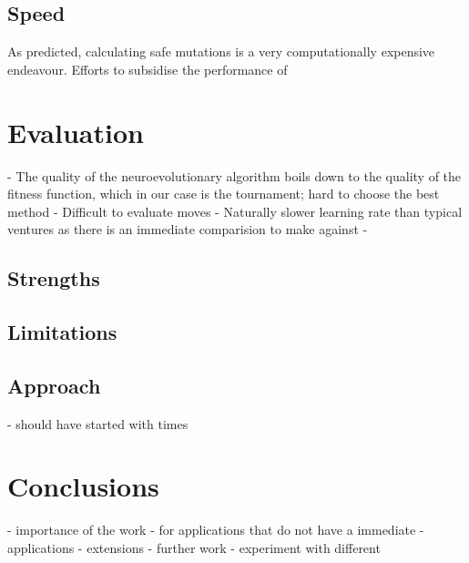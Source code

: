 \documentclass[12pt,a4paper]{article}
\begin{document}
    \subsection{Speed}
    
    As predicted, calculating safe mutations is a very computationally expensive endeavour. Efforts to subsidise the performance of 


\section{Evaluation}
    - The quality of the neuroevolutionary algorithm boils down to the quality of the fitness function, which in our case is the tournament; hard to choose the best method
    - Difficult to evaluate moves
    - Naturally slower learning rate than typical ventures as there is an immediate comparision to make against
    - 
    \subsection{Strengths}
    \subsection{Limitations}
    \subsection{Approach}
    - should have started with times

\section{Conclusions}

    - importance of the work
        - for applications that do not have a immediate 
    - applications
    - extensions
    - further work
        - experiment with different 
        
    

\end{document}
